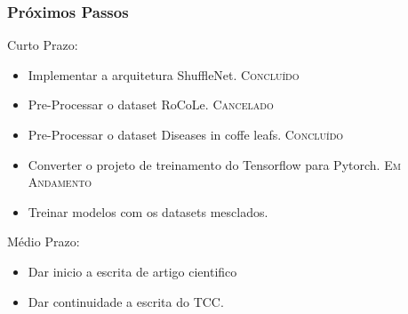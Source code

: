\documentclass[aspectratio=169]{beamer}
\begin{document}








\begin{frame}
    \frametitle{Próximos Passos}

    \begin{block}{Curto Prazo:}

        \begin{itemize}
            \item Implementar a arquitetura ShuffleNet. \textsc{Concluído}
            \item Pre-Processar o dataset RoCoLe. \textsc{Cancelado}
            \item Pre-Processar o dataset Diseases in coffe leafs. \textsc{Concluído}
            \item \color{blue} Converter o projeto de treinamento do Tensorflow para Pytorch. \textsc{Em Andamento}
            \item \color{blue} Treinar modelos com os datasets mesclados.
        \end{itemize}

    \end{block}



    \begin{block}{Médio Prazo:}

        \begin{itemize}
            \item \color{blue} Dar inicio a escrita de artigo cientifico
            \item \color{blue} Dar continuidade a escrita do TCC.
        \end{itemize}

    \end{block}




\end{frame}


\end{document}
